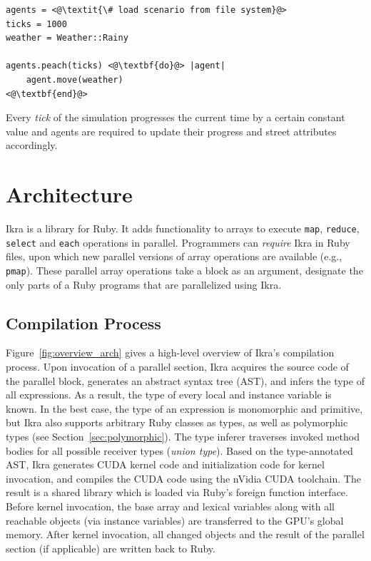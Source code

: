 \documentclass[preprint]{sigplanconf}
\begin{document}
\begin{lstlisting}
agents = <@\textit{\# load scenario from file system}@>
ticks = 1000
weather = Weather::Rainy

agents.peach(ticks) <@\textbf{do}@> |agent|
    agent.move(weather)
<@\textbf{end}@>
\end{lstlisting}

Every \emph{tick} of the simulation progresses the current time by a certain constant value and agents are required to update their progress and street attributes accordingly.

\section{Architecture}
Ikra is a library for Ruby. It adds functionality to arrays to execute \texttt{map}, \texttt{reduce}, \texttt{select} and \texttt{each} operations in parallel. Programmers can \emph{require} Ikra in Ruby files, upon which new parallel versions of array operations are available (e.g., \texttt{pmap}). These parallel array operations take a block as an argument, designate the only parts of a Ruby programs that are parallelized using Ikra.

\subsection{Compilation Process}
Figure~\ref{fig:overview_arch} gives a high-level overview of Ikra's compilation process. Upon invocation of a parallel section, Ikra acquires the source code of the parallel block, generates an abstract syntax tree (AST), and infers the type of all expressions. As a result, the type of every local and instance variable is known. In the best case, the type of an expression is monomorphic and primitive, but Ikra also supports arbitrary Ruby classes as types, as well as polymorphic types (see Section~\ref{sec:polymorphic}). The type inferer traverses invoked method bodies for all possible receiver types (\emph{union type}). Based on the type-annotated AST, Ikra generates CUDA kernel code and initialization code for kernel invocation, and compiles the CUDA code using the nVidia CUDA toolchain. The result is a shared library which is loaded via Ruby's foreign function interface. Before kernel invocation, the base array and lexical variables along with all reachable objects (via instance variables) are transferred to the GPU's global memory. After kernel invocation, all changed objects and the result of the parallel section (if applicable) are written back to Ruby.
\end{document}
